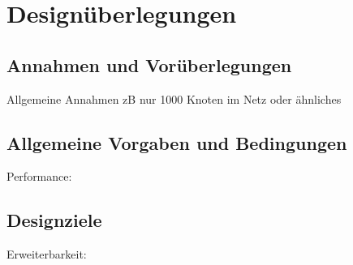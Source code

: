 \section{Designüberlegungen}

\subsection{Annahmen und Vorüberlegungen}
Allgemeine Annahmen zB nur 1000 Knoten im Netz oder ähnliches

\subsection{Allgemeine Vorgaben und Bedingungen}
Performance:

\subsection{Designziele}
Erweiterbarkeit:
